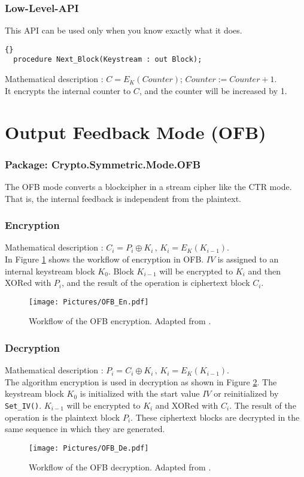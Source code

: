 \subsubsection*{Low-Level-API}\label{Low-Level}
This API can be used only when you know exactly what it does.
\begin{lstlisting}{}
  procedure Next_Block(Keystream : out Block);
\end{lstlisting}
Mathematical description : $C=E_K(Counter)$; $Counter:=Counter+1$.\\
It encrypts the internal counter to $C$, and the counter will be increased by 1.
\section{Output Feedback Mode (OFB)}\label{OutputFeedbackMode}
\subsubsection*{Package: Crypto.Symmetric.Mode.OFB}
The OFB mode converts a blockcipher in a stream cipher like the CTR mode. That is, the internal feedback is independent from the plaintext.
\subsubsection*{Encryption}
Mathematical description : $C_i=P_i\oplus K_i\,,\, K_i=E_K(K_{i-1})$.\\
In Figure \ref{OFBEN} shows the workflow of encryption in OFB.
$IV$ is assigned to an internal keystream block $K_0$. Block $K_{i-1}$ will be encrypted to $K_i$ and then XORed with $P_i$, and the result of the operation is ciphertext block $C_i$.
\begin{figure}[h]
\centering
\texttt{[image: Pictures/OFB\_En.pdf]} 
\caption{Workflow of the OFB encryption. Adapted from \cite{DBLP:reference/crypt/2011}.}\label{OFBEN}
\end{figure}
\subsubsection*{Decryption}
Mathematical description : $P_i=C_i\oplus K_i\,,\, K_i=E_K(K_{i-1})$.\\
The algorithm encryption is used in decryption as shown in Figure \ref{OFBDE}. The keystream block $K_0$ is initialized with the start value $IV$ or reinitialized by \texttt{Set\_IV()}. $K_{i-1}$ will be encrypted to $K_i$ and XORed with $C_i$. The result of the operation is the plaintext block $P_i$. These ciphertext blocks are decrypted in the same sequence in which they are generated.
\begin{figure}[h]
\centering
\texttt{[image: Pictures/OFB\_De.pdf]} 
\caption{Workflow of the OFB decryption. Adapted from \cite{DBLP:reference/crypt/2011}.}\label{OFBDE}
\end{figure}
